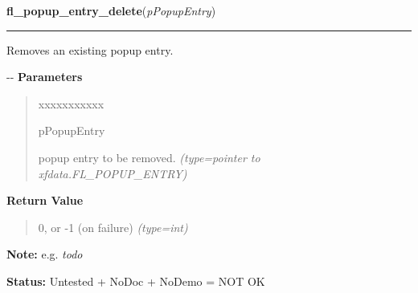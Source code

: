     \vspace{0.5ex}

\hspace{.8\funcindent}\begin{boxedminipage}{\funcwidth}

    \raggedright \textbf{fl\_popup\_entry\_delete}(\textit{pPopupEntry})

    \vspace{-1.5ex}

    \rule{\textwidth}{0.5\fboxrule}
\setlength{\parskip}{2ex}

Removes an existing popup entry.

-{}-
\setlength{\parskip}{1ex}
      \textbf{Parameters}
      \vspace{-1ex}

      \begin{quote}
        \begin{Ventry}{xxxxxxxxxxx}

          \item[pPopupEntry]


popup entry to be removed.
            {\it (type=pointer to xfdata.FL\_POPUP\_ENTRY)}

        \end{Ventry}

      \end{quote}

      \textbf{Return Value}
    \vspace{-1ex}

      \begin{quote}

0, or -1 (on failure)
      {\it (type=int)}

      \end{quote}

\textbf{Note:} 
e.g. \emph{todo}


\textbf{Status:} 
Untested + NoDoc + NoDemo = NOT OK


    \end{boxedminipage}

    \label{xformslib:flpopup:fl_popup_do}

    \vspace{0.5ex}

